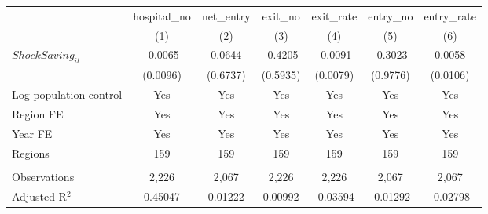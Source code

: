 \begingroup
\centering
\begin{tabular}{lcccccc}
   \toprule
                          & hospital\_no  & net\_entry  & exit\_no  & exit\_rate  & entry\_no  & entry\_rate \\    
                          & (1)           & (2)         & (3)       & (4)         & (5)        & (6)\\  
   \midrule 
   $ShockSaving_{it}$     & -0.0065       & 0.0644      & -0.4205   & -0.0091     & -0.3023    & 0.0058\\   
                          & (0.0096)      & (0.6737)    & (0.5935)  & (0.0079)    & (0.9776)   & (0.0106)\\   
   Log population control & Yes           & Yes         & Yes       & Yes         & Yes        & Yes\\  
   Region FE              & Yes           & Yes         & Yes       & Yes         & Yes        & Yes\\  
   Year FE                & Yes           & Yes         & Yes       & Yes         & Yes        & Yes\\  
   Regions                & 159           & 159         & 159       & 159         & 159        & 159\\  
    \\
   Observations           & 2,226         & 2,067       & 2,226     & 2,226       & 2,067      & 2,067\\  
   Adjusted R$^2$         & 0.45047       & 0.01222     & 0.00992   & -0.03594    & -0.01292   & -0.02798\\  
   \bottomrule
\end{tabular}
\par\endgroup

